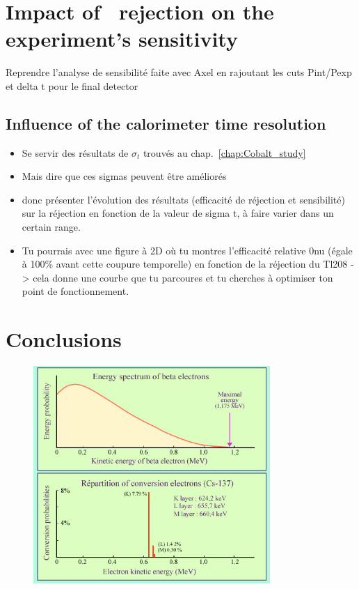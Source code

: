 \section{Impact of \Tl\ rejection on the experiment's sensitivity}
Reprendre l'analyse de sensibilité faite avec Axel en rajoutant les cuts Pint/Pexp et delta t pour le final detector

\subsection{Influence of the calorimeter time resolution}
\begin{itemize}
\item Se servir des résultats de $\sigma_{t}$ trouvés au chap.~\ref{chap:Cobalt_study}
\item Mais dire que ces sigmas peuvent être améliorés
\item donc présenter l'évolution des résultats (efficacité de réjection et sensibilité) sur la réjection en fonction de la valeur de sigma t, à faire varier dans un certain range.
\item Tu pourrais avec une figure à 2D où tu montres l'efficacité relative 0nu (égale à 100\% avant cette coupure temporelle) en fonction de la réjection du Tl208 -> cela donne une courbe que tu parcoures et tu cherches à optimiser ton point de fonctionnement.
\end{itemize}


\section{Conclusions}




\begin{figure}
  \centering
  \includegraphics[width=9cm]{timedifference/fig_timediff/SpectreBeta_Cs137.jpg}
  \caption{\label{fig:Tl_IC}}

\end{figure}
